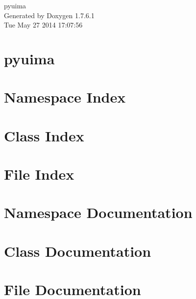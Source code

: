 \documentclass[a4paper]{book}
\begin{document}
\hypersetup{pageanchor=false,citecolor=blue}
\begin{titlepage}
\vspace*{7cm}
\begin{center}
{\Large pyuima }\\
\vspace*{1cm}
{\large \-Generated by Doxygen 1.7.6.1}\\
\vspace*{0.5cm}
{\small Tue May 27 2014 17:07:56}\\
\end{center}
\end{titlepage}
\clearemptydoublepage
{}
\tableofcontents
\clearemptydoublepage
{}
\hypersetup{pageanchor=true,citecolor=blue}
\chapter{pyuima}
\label{index}\hypertarget{index}{}
\chapter{\-Namespace \-Index}

\chapter{\-Class \-Index}

\chapter{\-File \-Index}

\chapter{\-Namespace \-Documentation}





\chapter{\-Class \-Documentation}

\chapter{\-File \-Documentation}





\printindex
\end{document}
